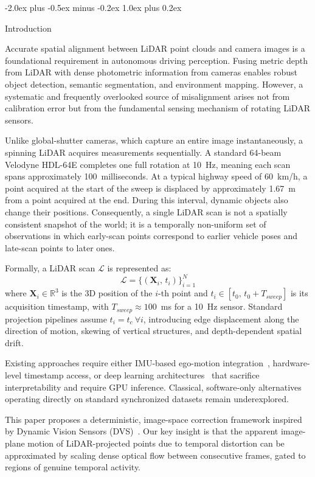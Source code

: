 \documentclass[conference]{IEEEtran}
\makeatletter
\def\section{\@startsection{section}{1}{\z@}
  {-2.0ex plus -0.5ex minus -0.2ex}
  {1.0ex plus 0.2ex}
  {\normalfont\large\bfseries\raggedright}}
\makeatother
\begin{document}
\section{Introduction}

Accurate spatial alignment between LiDAR point clouds and camera
images is a foundational requirement in autonomous driving
perception. Fusing metric depth from LiDAR with dense photometric
information from cameras enables robust object detection, semantic
segmentation, and environment mapping. However, a systematic and
frequently overlooked source of misalignment arises not from
calibration error but from the fundamental sensing mechanism of
rotating LiDAR sensors.

Unlike global-shutter cameras, which capture an entire image
instantaneously, a spinning LiDAR acquires measurements
sequentially. A standard 64-beam Velodyne HDL-64E completes one
full rotation at 10~Hz, meaning each scan spans approximately
100~milliseconds. At a typical highway speed of 60~km/h, a point
acquired at the start of the sweep is displaced by approximately
1.67~m from a point acquired at the end. During this interval,
dynamic objects also change their positions. Consequently, a single
LiDAR scan is not a spatially consistent snapshot of the world;
it is a temporally non-uniform set of observations in which
early-scan points correspond to earlier vehicle poses and late-scan
points to later ones.

Formally, a LiDAR scan $\mathcal{L}$ is represented as:
\begin{equation}
  \mathcal{L} = \{ (\mathbf{X}_i,\, t_i) \}_{i=1}^{N}
\end{equation}
where $\mathbf{X}_i \in \mathbb{R}^3$ is the 3D position of the
$i$-th point and $t_i \in [t_0,\, t_0 + T_{sweep}]$ is its
acquisition timestamp, with $T_{sweep} \approx 100$~ms for a
10~Hz sensor. Standard projection pipelines assume
$t_i = t_c\ \forall i$, introducing edge displacement along the
direction of motion, skewing of vertical structures, and
depth-dependent spatial drift.

Existing approaches require either IMU-based ego-motion
integration~\cite{kitti}, hardware-level timestamp access, or
deep learning architectures~\cite{delta2025,huang2021} that
sacrifice interpretability and require GPU inference. Classical,
software-only alternatives operating directly on standard
synchronized datasets remain underexplored.

This paper proposes a deterministic, image-space correction
framework inspired by Dynamic Vision Sensors
(DVS)~\cite{gallego2024}. Our key insight is that the apparent
image-plane motion of LiDAR-projected points due to temporal
distortion can be approximated by scaling dense optical flow
between consecutive frames, gated to regions of genuine temporal
activity.
\end{document}
